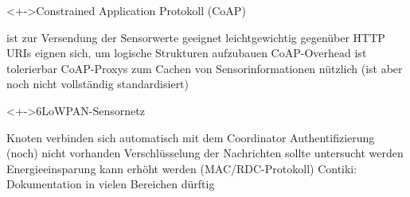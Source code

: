 \begin{frame}{\insertsubsection}{}
	\begin{block}<+->{Constrained Application Protokoll (CoAP)}
		\begin{proconlist}
		\pro 	ist zur Versendung der Sensorwerte geeignet
		\pro 	leichtgewichtig gegenüber HTTP
		\pro 	URIs eignen sich, um logische Strukturen aufzubauen
		\pro 	CoAP-Overhead ist tolerierbar
		\contra CoAP-Proxys zum Cachen von Sensorinformationen nützlich
			(ist aber noch nicht vollständig standardisiert)
		\end{proconlist}
	\end{block}
	\vfill
	\begin{block}<+->{6LoWPAN-Sensornetz}
		\begin{proconlist}
		\pro 	Knoten verbinden sich automatisch mit dem Coordinator
		\contra Authentifizierung (noch) nicht vorhanden
		\contra Verschlüsselung der Nachrichten sollte untersucht werden
		\contra Energieeinsparung kann erhöht werden (MAC/RDC-Protokoll)
		\contra Contiki: Dokumentation in vielen Bereichen dürftig
		\end{proconlist}
	\end{block}
\end{frame}


